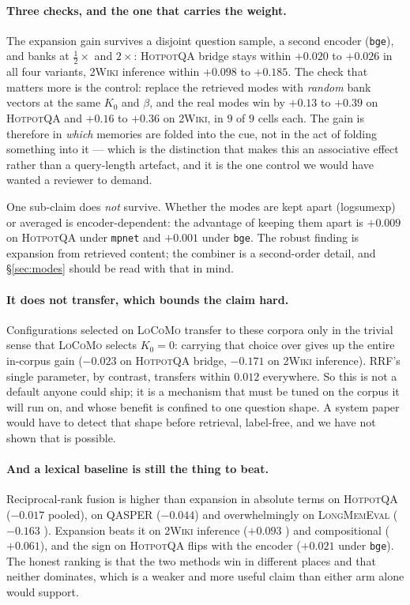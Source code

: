 \paragraph{Three checks, and the one that carries the weight.} The expansion gain survives a
disjoint question sample, a second encoder (\texttt{bge}), and banks at $\tfrac{1}{2}\times$
and $2\times$: \textsc{HotpotQA} bridge stays within $+0.020$ to $+0.026$ in all four
variants, \textsc{2Wiki} inference within $+0.098$ to $+0.185$. The check that matters more
is the control: replace the retrieved modes with \emph{random} bank vectors at the same
$K_0$ and $\beta$, and the real modes win by $+0.13$ to $+0.39$ on \textsc{HotpotQA} and
$+0.16$ to $+0.36$ on \textsc{2Wiki}, in $9$ of $9$ cells each. The gain is therefore in
\emph{which} memories are folded into the cue, not in the act of folding something into it
--- which is the distinction that makes this an associative effect rather than a query-length
artefact, and it is the one control we would have wanted a reviewer to demand.

One sub-claim does \emph{not} survive. Whether the modes are kept apart (logsumexp) or
averaged is encoder-dependent: the advantage of keeping them apart is $+0.009$
 on \textsc{HotpotQA} under \texttt{mpnet} and $+0.001$
 under \texttt{bge}. The robust finding is expansion from retrieved
content; the combiner is a second-order detail, and \S\ref{sec:modes} should be read with
that in mind.

\paragraph{It does not transfer, which bounds the claim hard.} Configurations selected on
\textsc{LoCoMo} transfer to these corpora only in the trivial sense that \textsc{LoCoMo}
selects $K_0{=}0$: carrying that choice over gives up the entire in-corpus gain
($-0.023$ on \textsc{HotpotQA} bridge, $-0.171$ on \textsc{2Wiki} inference). RRF's single
parameter, by contrast, transfers within $0.012$ everywhere. So this is not a default anyone
could ship; it is a mechanism that must be tuned on the corpus it will run on, and whose
benefit is confined to one question shape. A system paper would have to detect that shape
before retrieval, label-free, and we have not shown that is possible.

\paragraph{And a lexical baseline is still the thing to beat.} Reciprocal-rank fusion is
higher than expansion in absolute terms on \textsc{HotpotQA} ($-0.017$ 
pooled), on \textsc{QASPER} ($-0.044$) and overwhelmingly on \textsc{LongMemEval}
($-0.163$ ). Expansion beats it on \textsc{2Wiki} inference ($+0.093$
) and compositional ($+0.061$), and the sign on \textsc{HotpotQA} flips
with the encoder ($+0.021$ under \texttt{bge}). The honest ranking is that the two methods
win in different places and that neither dominates, which is a weaker and more useful claim
than either arm alone would support.

